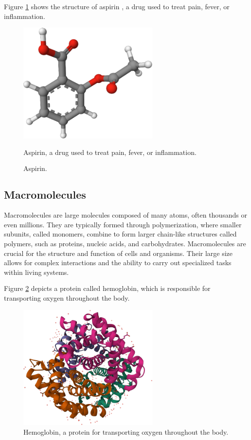\documentclass[
  digital,     %
  oneside,     %
  nosansbold,  %
  nocolorbold, %
  lof,         %
  lot,         %
]{fithesis4}
\begin{document}
Figure \ref{fig:aspirin} shows the structure of aspirin \cite{pubchem_aspirin}, a drug used to treat pain, fever, or inflammation.

\begin{figure}[htbp]
  \begin{center}
    \includegraphics[width=7cm]{figures/aspirin.png}
  \end{center}
  \caption{Aspirin.}{Aspirin, a drug used to treat pain, fever, or inflammation.}
  \label{fig:aspirin}
\end{figure}

\subsection{Macromolecules}

Macromolecules are large molecules composed of many atoms, often thousands or even millions. They are typically formed through polymerization, where smaller subunits, called monomers, combine to form larger chain-like structures called polymers, such as proteins, nucleic acids, and carbohydrates. Macromolecules are crucial for the structure and function of cells and organisms. Their large size allows for complex interactions and the ability to carry out specialized tasks within living systems. \cite{clark2018biology,gu2009structural}

 Figure \ref{fig:hemoglobin} depicts a protein called hemoglobin, which is responsible for transporting oxygen throughout the body.

\begin{figure}[htbp]
  \begin{center}
    \includegraphics[width=7cm]{figures/hemoglobin.png}
  \end{center}
  \caption[Hemoglobin protein.]{Hemoglobin, a protein for transporting oxygen throughout the body.}
  \label{fig:hemoglobin}
\end{figure}
\end{document}
